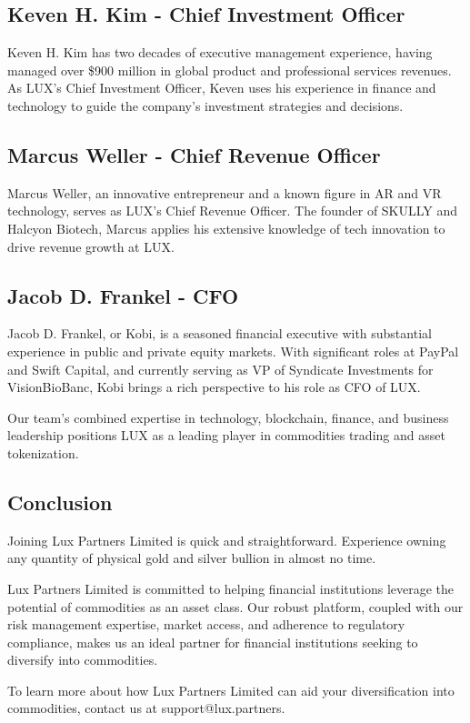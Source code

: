 \documentclass[11pt]{article}
\begin{document}
\subsection{Keven H. Kim - Chief Investment Officer}

Keven H. Kim has two decades of executive management experience, having managed over \$900 million in global product and professional services revenues. As LUX's Chief Investment Officer, Keven uses his experience in finance and technology to guide the company's investment strategies and decisions.


\subsection{Marcus Weller - Chief Revenue Officer}

Marcus Weller, an innovative entrepreneur and a known figure in AR and VR technology, serves as LUX's Chief Revenue Officer. The founder of SKULLY and Halcyon Biotech, Marcus applies his extensive knowledge of tech innovation to drive revenue growth at LUX.


\subsection{Jacob D. Frankel - CFO}

Jacob D. Frankel, or Kobi, is a seasoned financial executive with substantial experience in public and private equity markets. With significant roles at PayPal and Swift Capital, and currently serving as VP of Syndicate Investments for VisionBioBanc, Kobi brings a rich perspective to his role as CFO of LUX.


Our team's combined expertise in technology, blockchain, finance, and business leadership positions LUX as a leading player in commodities trading and asset tokenization.


\subsection{Conclusion}

Joining Lux Partners Limited is quick and straightforward. Experience owning any quantity of physical gold and silver bullion in almost no time.


Lux Partners Limited is committed to helping financial institutions leverage the potential of commodities as an asset class. Our robust platform, coupled with our risk management expertise, market access, and adherence to regulatory compliance, makes us an ideal partner for financial institutions seeking to diversify into commodities.


To learn more about how Lux Partners Limited can aid your diversification into commodities, contact us at support@lux.partners.
\end{document}
